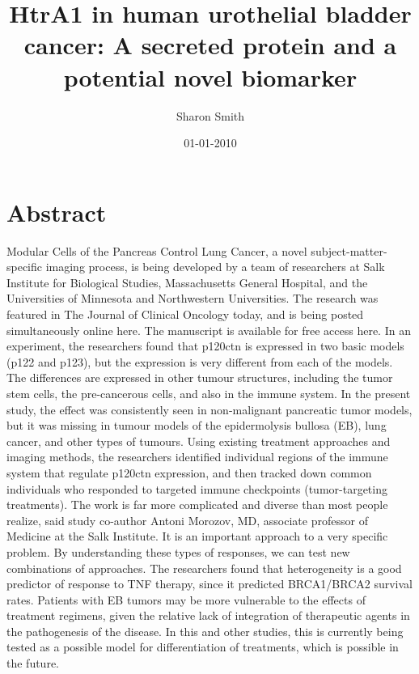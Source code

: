 \documentclass{article}%
\title{HtrA1 in human urothelial bladder cancer: A secreted protein and a potential novel biomarker}%
\author{Sharon Smith}%
\affil{INSERM, U895 (quipe 1), Equipe lablise Ligue Contre le Cancer, C3M, 06204 Nice, France}%
\date{01{-}01{-}2010}%
\begin{document}
%
\normalsize%
\maketitle%
\section{Abstract}%
\label{sec:Abstract}%
Modular Cells of the Pancreas Control Lung Cancer, a novel subject{-}matter{-}specific imaging process, is being developed by a team of researchers at Salk Institute for Biological Studies, Massachusetts General Hospital, and the Universities of Minnesota and Northwestern Universities. The research was featured in The Journal of Clinical Oncology today, and is being posted simultaneously online here. The manuscript is available for free access here.\newline%
In an experiment, the researchers found that p120ctn is expressed in two basic models (p122 and p123), but the expression is very different from each of the models. The differences are expressed in other tumour structures, including the tumor stem cells, the pre{-}cancerous cells, and also in the immune system. In the present study, the effect was consistently seen in non{-}malignant pancreatic tumor models, but it was missing in tumour models of the epidermolysis bullosa (EB), lung cancer, and other types of tumours. Using existing treatment approaches and imaging methods, the researchers identified individual regions of the immune system that regulate p120ctn expression, and then tracked down common individuals who responded to targeted immune checkpoints (tumor{-}targeting treatments).\newline%
The work is far more complicated and diverse than most people realize, said study co{-}author Antoni Morozov, MD, associate professor of Medicine at the Salk Institute. It is an important approach to a very specific problem. By understanding these types of responses, we can test new combinations of approaches. The researchers found that heterogeneity is a good predictor of response to TNF therapy, since it predicted BRCA1/BRCA2 survival rates.\newline%
Patients with EB tumors may be more vulnerable to the effects of treatment regimens, given the relative lack of integration of therapeutic agents in the pathogenesis of the disease. In this and other studies, this is currently being tested as a possible model for differentiation of treatments, which is possible in the future.\newline%
\end{document}
